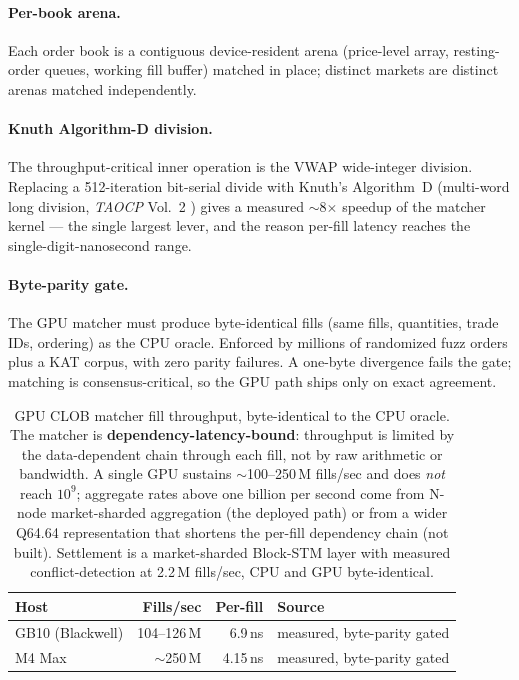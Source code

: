 \paragraph{Per-book arena.} Each order book is a contiguous
device-resident arena (price-level array, resting-order queues, working
fill buffer) matched in place; distinct markets are distinct arenas
matched independently.

\paragraph{Knuth Algorithm-D division.} The throughput-critical inner
operation is the VWAP wide-integer division. Replacing a 512-iteration
bit-serial divide with Knuth's Algorithm~D (multi-word long division,
\emph{TAOCP} Vol.~2 \cite{knuthtaocp2}) gives a measured $\sim$8$\times$
speedup of the matcher kernel --- the single largest lever, and the
reason per-fill latency reaches the single-digit-nanosecond range.

\paragraph{Byte-parity gate.} The GPU matcher must produce byte-identical
fills (same fills, quantities, trade IDs, ordering) as the CPU oracle.
Enforced by millions of randomized fuzz orders plus a KAT corpus, with
zero parity failures. A one-byte divergence fails the gate; matching is
consensus-critical, so the GPU path ships only on exact agreement.

\begin{table}[H]
\centering
\small
\begin{tabular}{lrrl}
\toprule
\textbf{Host} & \textbf{Fills/sec} & \textbf{Per-fill} & \textbf{Source} \\
\midrule
GB10 (Blackwell) & 104--126\,M & 6.9\,ns  & measured, byte-parity gated \\
M4 Max           & $\sim$250\,M  & 4.15\,ns & measured, byte-parity gated \\
\bottomrule
\end{tabular}
\caption{GPU CLOB matcher fill throughput, byte-identical to the CPU
oracle. The matcher is \textbf{dependency-latency-bound}: throughput is
limited by the data-dependent chain through each fill, not by raw
arithmetic or bandwidth. A single GPU sustains $\sim$100--250\,M
fills/sec and does \emph{not} reach $10^9$; aggregate rates above one
billion per second come from N-node market-sharded aggregation (the
deployed path) or from a wider Q64.64 representation that shortens the
per-fill dependency chain (not built). Settlement is a market-sharded
Block-STM layer with measured conflict-detection at 2.2\,M fills/sec,
CPU and GPU byte-identical.}
\label{tab:clob-matcher}
\end{table}

